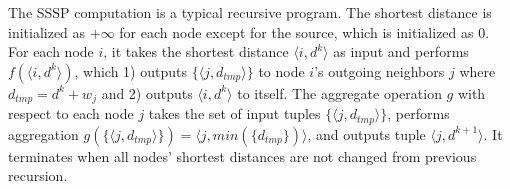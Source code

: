 \begin{comment}
\begin{verbatim}
Program 1. Single Source Shortest Path
\end{verbatim}
\vspace{-0.1in}
\small
\begin{lstlisting}
r1. sssp(X,$d$)$\leftarrow$ X=1,$d=0$.
r2. sssp(Y,min[$d$])$\leftarrow$ sssp(X,$d1$),edge(X,Y,$d2$),
$d=d1+d2$,sssp(Y,$d$).
\end{lstlisting}
\normalsize
\end{comment}

 The SSSP computation is a typical recursive program. The shortest distance is initialized as $+\infty$ for each node except for the source, which is initialized as 0. For each node $i$, it takes the shortest distance $\langle i, d^k\rangle$ as input and performs $f(\langle i, d^k\rangle)$, which 1) outputs $\{\langle j,d_{tmp}\rangle\}$ to node $i$'s outgoing neighbors $j$ where $d_{tmp}=d^k+w_j$ and 2) outputs $\langle i,d^k\rangle$ to itself. The aggregate operation $g$ with respect to each node $j$ takes the set of input tuples $\{\langle j,d_{tmp}\rangle\}$, performs aggregation $g(\{\langle j,d_{tmp}\rangle\})=\langle j, min(\{d_{tmp}\})\rangle$, and outputs tuple $\langle j,d^{k+1}\rangle$. It terminates when all nodes' shortest distances are not changed from previous recursion.

